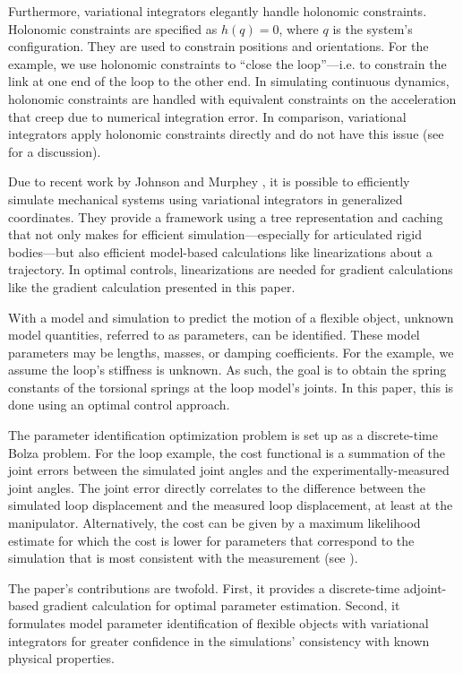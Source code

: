 \documentclass[letterpaper, 10pt, conference]{ieeeconf}
\begin{document}
Furthermore, variational integrators elegantly handle holonomic constraints.  Holonomic constraints are specified as $h(q) = 0$, where $q$ is the system's configuration.  They are used to constrain positions and orientations.  For the example, we use holonomic constraints to ``close the loop''---i.e. to constrain the link at one end of the loop to the other end.  In simulating continuous dynamics, holonomic constraints are handled with equivalent constraints on the acceleration that creep due to numerical integration error.  In comparison, variational integrators apply holonomic constraints directly and do not have this issue (see \cite{johnson_murphey_scalable} for a discussion).

Due to recent work by Johnson and Murphey \cite{johnson_murphey_scalable, johnson_murphey_linearization}, it is possible to efficiently simulate mechanical systems using variational integrators in generalized coordinates. They provide a framework using a tree representation and caching that not only makes for efficient simulation---especially for articulated rigid bodies---but also efficient model-based calculations like linearizations about a trajectory.   In optimal controls, linearizations are needed for gradient calculations like the gradient calculation presented in this paper. 

With a model and simulation to predict the motion of a flexible object, unknown model quantities, referred to as parameters, can be identified.  These model parameters may be lengths, masses, or damping coefficients.  For the example, we assume the loop's stiffness is unknown.  As such, the goal is to obtain the spring constants of the torsional springs at the loop model's joints.  In this paper, this is done using an optimal control approach.

The parameter identification optimization problem is set up as a discrete-time Bolza problem.  For the loop example, the cost functional is a summation of the joint errors between the simulated joint angles and the experimentally-measured joint angles.  The joint error directly correlates to the difference between the simulated loop displacement and the measured loop displacement, at least at the manipulator.  Alternatively, the cost can be given by a maximum likelihood estimate for which the cost is lower for parameters that correspond to the simulation that is most consistent with the measurement (see \cite{houska_etal}).  

The paper's contributions are twofold.  First, it provides a discrete-time adjoint-based gradient calculation for optimal parameter estimation.  Second, it formulates model parameter identification of flexible objects with variational integrators for greater confidence in the simulations' consistency with known physical properties.
\end{document}
